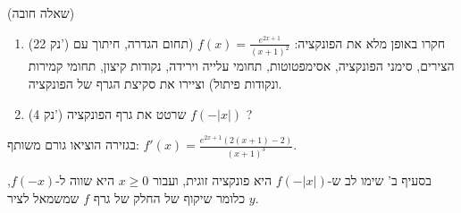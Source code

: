
\begin{question}
(שאלה חובה)
\begin{enumerate}
  \item (22 נק') חקרו באופן מלא את הפונקציה: $\displaystyle f(x)=\frac{e^{2x+1}}{(x+1)^2}$ (תחום הגדרה, חיתוך עם הצירים, סימני הפונקציה, אסימפטוטות, תחומי עלייה וירידה, נקודות קיצון, תחומי קמירות ונקודות פיתול) וציירו את סקיצת הגרף של הפונקציה.
  \item (4 נק') שרטט את גרף הפונקציה $f(-|x|)$ ?
\end{enumerate}
\end{question}

\begin{hint}
בגזירה הוציאו גורם משותף: $f'(x)=\frac{e^{2x+1}\left(2(x+1)-2\right)}{(x+1)^3}$.
\end{hint}

\begin{hint}
בסעיף ב' שימו לב ש-$f(-|x|)$ היא פונקציה זוגית, ועבור $x\ge0$ היא שווה ל-$f(-x)$, כלומר שיקוף של החלק של גרף $f$ שמשמאל לציר $y$.
\end{hint}

